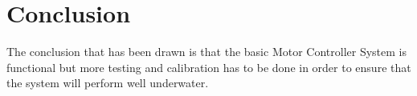 \section{Conclusion}\label{sec:conclusion}
 The conclusion that has been drawn is that the basic Motor Controller System is functional but more testing and calibration has to be done in order to ensure that the system will perform well underwater.